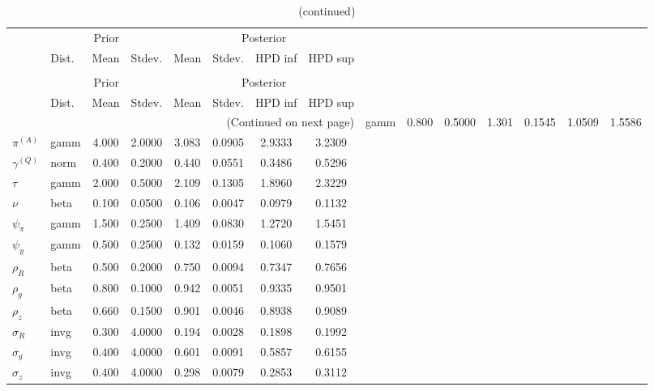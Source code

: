  
\begin{center}
\begin{longtable}{llcccccc} 
\caption{Results from Metropolis-Hastings (parameters)}
 \label{Table:MHPosterior:1}\\
\toprule 
  & \multicolumn{3}{c}{Prior}  &  \multicolumn{4}{c}{Posterior} \\
  \cmidrule(r{.75em}){2-4} \cmidrule(r{.75em}){5-8}
  & Dist. & Mean  & Stdev. & Mean & Stdev. & HPD inf & HPD sup\\
\midrule \endfirsthead 
\caption{(continued)}\\\toprule 
  & \multicolumn{3}{c}{Prior}  &  \multicolumn{4}{c}{Posterior} \\
  \cmidrule(r{.75em}){2-4} \cmidrule(r{.75em}){5-8}
  & Dist. & Mean  & Stdev. & Mean & Stdev. & HPD inf & HPD sup\\
\midrule \endhead 
\bottomrule \multicolumn{8}{r}{(Continued on next page)} \endfoot 
\bottomrule \endlastfoot 
${r_{A}}$ & gamm &   0.800 & 0.5000 &   1.301& 0.1545 &  1.0509 &  1.5586 \\ 
${\pi^{(A)}}$ & gamm &   4.000 & 2.0000 &   3.083& 0.0905 &  2.9333 &  3.2309 \\ 
${\gamma^{(Q)}}$ & norm &   0.400 & 0.2000 &   0.440& 0.0551 &  0.3486 &  0.5296 \\ 
${\tau}$ & gamm &   2.000 & 0.5000 &   2.109& 0.1305 &  1.8960 &  2.3229 \\ 
${\nu}$ & beta &   0.100 & 0.0500 &   0.106& 0.0047 &  0.0979 &  0.1132 \\ 
${\psi_\pi}$ & gamm &   1.500 & 0.2500 &   1.409& 0.0830 &  1.2720 &  1.5451 \\ 
${\psi_y}$ & gamm &   0.500 & 0.2500 &   0.132& 0.0159 &  0.1060 &  0.1579 \\ 
${\rho_R}$ & beta &   0.500 & 0.2000 &   0.750& 0.0094 &  0.7347 &  0.7656 \\ 
${\rho_{g}}$ & beta &   0.800 & 0.1000 &   0.942& 0.0051 &  0.9335 &  0.9501 \\ 
${\rho_z}$ & beta &   0.660 & 0.1500 &   0.901& 0.0046 &  0.8938 &  0.9089 \\ 
${\sigma_R}$ & invg &   0.300 & 4.0000 &   0.194& 0.0028 &  0.1898 &  0.1992 \\ 
${\sigma_{g}}$ & invg &   0.400 & 4.0000 &   0.601& 0.0091 &  0.5857 &  0.6155 \\ 
${\sigma_z}$ & invg &   0.400 & 4.0000 &   0.298& 0.0079 &  0.2853 &  0.3112 \\ 
\end{longtable}
 \end{center}
